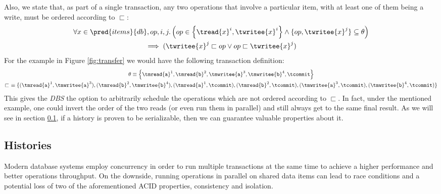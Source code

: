 Also, we state that, as part of a single transaction, any two operations that involve a particular item, with at least one of them being a write, must be ordered according to $\sqsubset$:
\begin{gather*}
	\forall x \in \pred{items}{db}, op, i, j \ldotp \left( op \in \left\lbrace \tread{x}^i, \twritee{x}^i \right\rbrace \land \lbrace op, \twritee{x}^j \rbrace \subseteq \theta \right) \\ \implies (\twritee{x}^j \sqsubset op \lor op \sqsubset \twritee{x}^j)
\end{gather*}
For the example in Figure \ref{fig:transfer} we would have the following transaction definition:
\begin{gather*}
\theta \equiv \left\lbrace \tmread{\texttt{a}}^1, \tmread{\texttt{b}}^2, \tmwritee{\texttt{a}}^3, \tmwritee{\texttt{b}}^4, \tcommit \right\rbrace
\\
\sqsubset\ \equiv \{ (\tmread{\texttt{a}}^1, \tmwritee{\texttt{a}}^3), (\tmread{\texttt{b}}^2, \tmwritee{\texttt{b}}^4), (\tmread{\texttt{a}}^1, \tcommit), (\tmread{\texttt{b}}^2, \tcommit), (\tmwritee{\texttt{a}}^3, \tcommit), (\tmwritee{\texttt{b}}^4, \tcommit) \}
\end{gather*}
This gives the \textit{DBS} the option to arbitrarily schedule the operations which are not ordered according to $\sqsubset$. In fact, under the mentioned example, one could invert the order of the two reads (or even run them in parallel) and still always get to the same final result. As we will see in section \ref{histories}, if a history is proven to be serializable, then we can guarantee valuable properties about it.

\subsection{Histories} \label{histories}

Modern database systems employ concurrency in order to run multiple transactions at the same time to achieve a higher performance and better operations throughput. On the downside, running operations in parallel on shared data items can lead to race conditions and a potential loss of two of the aforementioned ACID properties, consistency and isolation.

